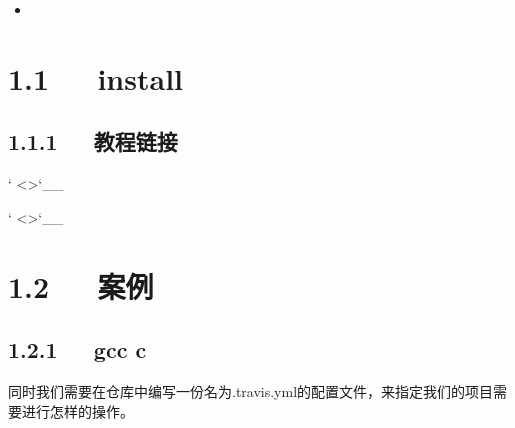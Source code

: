 \documentclass[letterpaper,12pt,english]{sphinxmanual}
\begin{document}
\begin{sphinxShadowBox}
\begin{itemize}
\begin{itemize}
\begin{itemize}
\begin{itemize}
\item {} 
\label{\detokenize{001software/001install/001._u7f51_u7ad9/travisCI:id19}}{\hyperref[\detokenize{001software/001install/001._u7f51_u7ad9/travisCI:id4}]{}}

\end{itemize}

\end{itemize}

\end{itemize}

\end{itemize}
\end{sphinxShadowBox}


\section{1.1   install}
\label{\detokenize{001software/001install/001._u7f51_u7ad9/travisCI:install}}


\subsection{1.1.1   教程链接}
\label{\detokenize{001software/001install/001._u7f51_u7ad9/travisCI:id1}}




{}` \textless{}\textgreater{}{}`\_\_

{}` \textless{}\textgreater{}{}`\_\_


\section{1.2   案例}
\label{\detokenize{001software/001install/001._u7f51_u7ad9/travisCI:id2}}

\subsection{1.2.1   gcc c}
\label{\detokenize{001software/001install/001._u7f51_u7ad9/travisCI:gcc-c}}
同时我们需要在仓库中编写一份名为.travis.yml的配置文件，来指定我们的项目需要进行怎样的操作。
\end{document}

